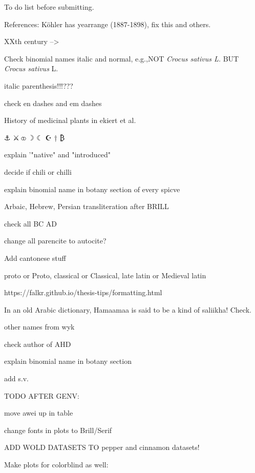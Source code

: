 To do list before submitting.

References: Köhler has yearrange (1887-1898), fix this and others.

XXth century --> \textss

Check binomial names italic and normal, e.g.,NOT \textit{Crocus sativus L.} BUT \textit{Crocus sativus} L.

italic parenthesis!!!???

check en dashes and em dashes

History of medicinal plants in ekiert et al.

⚓ 
⚔
⚭
☽
☾
☪
†
₿

explain '"native" and "introduced"

decide if chili or chilli

explain binomial name in botany section of every spicve


Arbaic, Hebrew, Persian transliteration after BRILL

check all BC AD


change all parencite to autocite?

Add cantonese stuff

proto or Proto, classical or Classical, late latin or Medieval latin

https://falkr.github.io/thesis-tips/formatting.html

In an old Arabic dictionary, Hamaamaa is said to be a kind of saliikha! Check.

other names from wyk

check author of AHD

explain binomial name in botany section

add s.v.

TODO AFTER GENV:

move awei up in table

change fonts in plots to Brill/Serif

ADD WOLD DATASETS TO pepper and cinnamon datasets!

Make plots for colorblind as well:

